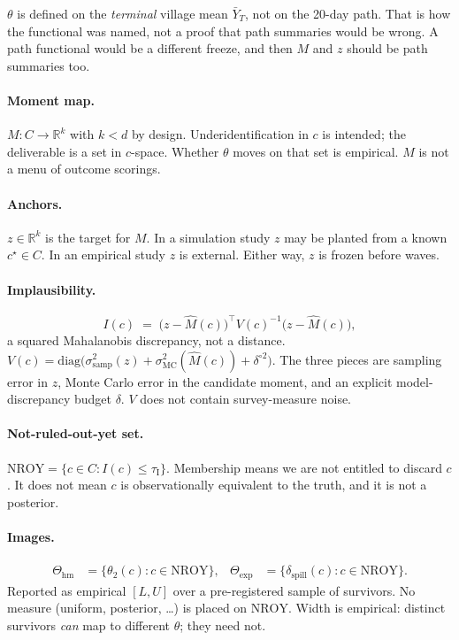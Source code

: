 \documentclass[11pt]{article}
\newcommand{\NROY}{\mathrm{NROY}}
\newcommand{\hm}{\mathrm{hm}}
\newcommand{\expset}{\mathrm{exp}}
\newcommand{\thr}{\tau_{\mathrm{I}}}
\begin{document}
$\theta$ is defined on the \emph{terminal} village mean $\bar Y_T$, not
on the 20-day path. That is how the functional was named, not a proof
that path summaries would be wrong. A path functional would be a
different freeze, and then $M$ and $z$ should be path summaries too.

\paragraph{Moment map.}
$M:C\to\mathbb{R}^k$ with $k<d$ by design. Underidentification in $c$
is intended; the deliverable is a set in $c$-space. Whether $\theta$
moves on that set is empirical. $M$ is not a menu of outcome scorings.

\paragraph{Anchors.}
$z\in\mathbb{R}^k$ is the target for $M$. In a simulation study $z$ may
be planted from a known $c^\star\in C$. In an empirical study $z$ is
external. Either way, $z$ is frozen before waves.

\paragraph{Implausibility.}
\begin{equation}
  I(c)
  \;=\;
  \bigl(z-\widehat M(c)\bigr)^{\!\top}
  V(c)^{-1}
  \bigl(z-\widehat M(c)\bigr),
\end{equation}
a squared Mahalanobis discrepancy, not a distance.
$V(c)=\mathrm{diag}\bigl(\sigma^2_{\mathrm{samp}}(z)
+\sigma^2_{\mathrm{MC}}(\widehat M(c))
+\delta^{\circ 2}\bigr)$.
The three pieces are sampling error in $z$, Monte Carlo error in the
candidate moment, and an explicit model-discrepancy budget $\delta$.
$V$ does not contain survey-measure noise.

\paragraph{Not-ruled-out-yet set.}
$\NROY=\{c\in C:I(c)\le\thr\}$. Membership means we are not entitled to
discard $c$. It does not mean $c$ is observationally equivalent to the
truth, and it is not a posterior.

\paragraph{Images.}
\begin{align}
  \Theta_{\hm}
  &= \{\theta_2(c):c\in\NROY\},
  &
  \Theta_{\expset}
  &= \{\delta_{\mathrm{spill}}(c):c\in\NROY\}.
\end{align}
Reported as empirical $[L,U]$ over a pre-registered sample of
survivors. No measure (uniform, posterior, \ldots) is placed on
$\NROY$. Width is empirical: distinct survivors \emph{can} map to
different $\theta$; they need not.
\end{document}
